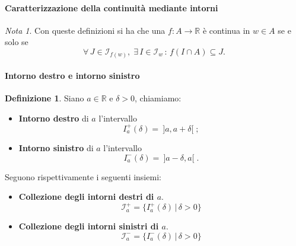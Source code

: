 \documentclass{article}
\theoremstyle{plain}
\theoremstyle{definition}
\newtheorem{defn}{Definizione}[section]
\theoremstyle{remark}
\newtheorem{note}{Nota}
\begin{document}
\paragraph{Caratterizzazione della continuità mediante intorni}
\begin{note}
    Con queste definizioni si ha che una $f:A\to\mathbb{R}$ è continua in $w\in A$ se e solo se 
    \[\forall\, J\in \mathcal{I}_{f(w)},\;\exists\, I\in \mathcal{I}_w\,:\,f(I\cap A)\subseteq J.\]
\end{note}

\vspace{10pt}

\paragraph{Intorno destro e intorno sinistro}
\begin{bxthm}
\begin{defn}
    Siano $a\in\mathbb{R}$ e $\delta>0$, chiamiamo:
\begin{itemize}
    \item \textbf{Intorno destro} di $a$ l'intervallo 
    \[I^+_a(\delta)= \ ]a,a+\delta[\;;\]
    \item \textbf{Intorno sinistro} di $a$ l'intervallo 
    \[I^-_a(\delta)= \ ]a-\delta,a[\;.\]
\end{itemize}
Seguono rispettivamente i seguenti insiemi:
\begin{itemize}
    \item \textbf{Collezione degli intorni destri di $a$}.
    \[\mathcal{I}^+_{a}=\{I^+_a(\delta)\, |\, \delta>0\}\] 
    \item \textbf{Collezione degli intorni sinistri di $a$}.
    \[\mathcal{I}^-_{a}=\{I^-_a(\delta)\, |\, \delta>0\}\] 
\end{itemize}
\end{defn}
\end{bxthm}

\vspace{10pt}
\end{document}
